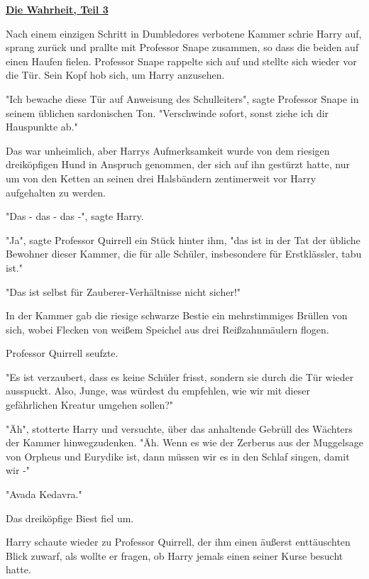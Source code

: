 

\hypertarget{die-wahrheit-teil-3}{%

\textbf{\uline{Die Wahrheit, Teil 3}}

Nach einem einzigen Schritt in Dumbledores verbotene Kammer schrie Harry auf, sprang zurück und prallte mit Professor Snape zusammen, so dass die beiden auf einen Haufen fielen. Professor Snape rappelte sich auf und stellte sich wieder vor die Tür. Sein Kopf hob sich, um Harry anzusehen.

"Ich bewache diese Tür auf Anweisung des Schulleiters", sagte Professor Snape in seinem üblichen sardonischen Ton. "Verschwinde sofort, sonst ziehe ich dir Hauspunkte ab."

Das war unheimlich, aber Harrys Aufmerksamkeit wurde von dem riesigen dreiköpfigen Hund in Anspruch genommen, der sich auf ihn gestürzt hatte, nur um von den Ketten an seinen drei Halsbändern zentimerweit vor Harry aufgehalten zu werden.

"Das - das - das -", sagte Harry.

"Ja", sagte Professor Quirrell ein Stück hinter ihm, "das ist in der Tat der übliche Bewohner dieser Kammer, die für alle Schüler, insbesondere für Erstklässler, tabu ist."

"Das ist selbst für Zauberer-Verhältnisse nicht sicher!"

In der Kammer gab die riesige schwarze Bestie ein mehrstimmiges Brüllen von sich, wobei Flecken von weißem Speichel aus drei Reißzahnmäulern flogen.

Professor Quirrell seufzte.

"Es ist verzaubert, dass es keine Schüler frisst, sondern sie durch die Tür wieder ausspuckt. Also, Junge, was würdest du empfehlen, wie wir mit dieser gefährlichen Kreatur umgehen sollen?"

"Äh", stotterte Harry und versuchte, über das anhaltende Gebrüll des Wächters der Kammer hinwegzudenken. "Äh. Wenn es wie der Zerberus aus der Muggelsage von Orpheus und Eurydike ist, dann müssen wir es in den Schlaf singen, damit wir -"

"Avada Kedavra."

Das dreiköpfige Biest fiel um.

Harry schaute wieder zu Professor Quirrell, der ihm einen äußerst enttäuschten Blick zuwarf, als wollte er fragen, ob Harry jemals einen seiner Kurse besucht hatte.

}
